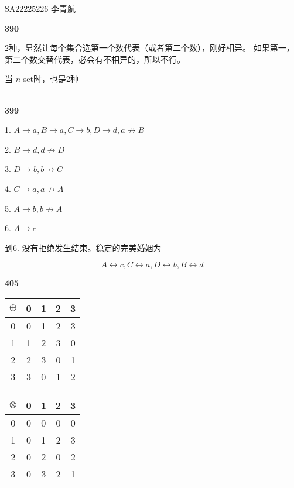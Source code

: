 \documentclass[UTF8]{ctexart}
\begin{document}
    SA22225226 李青航

    \noindent\textbf{390}

    2种，显然让每个集合选第一个数代表（或者第二个数），刚好相异。
    如果第一，第二个数交替代表，必会有不相异的，所以不行。

    当 $n$ set时，也是2种

    ~\\
    \noindent\textbf{399}

    1. $A\rightarrow a, B\rightarrow a, 
    C\rightarrow b, D\rightarrow d, a\not \rightarrow B$

    2. $B\rightarrow d, d\not \rightarrow D$

    3. $D\rightarrow b, b\not \rightarrow C $

    4. $C\rightarrow a, a\not \rightarrow A$

    5. $A \rightarrow b, b\not \rightarrow A$

    6. $A \rightarrow c$

    到6. 没有拒绝发生结束。稳定的完美婚姻为

    $$A \longleftrightarrow  c, C \longleftrightarrow a, D \longleftrightarrow b, B\longleftrightarrow d$$

    \noindent\textbf{405}

    \begin{table}[h]
        \centering
        \begin{tabular}{c|cccc} 
        \toprule
        $\oplus$ & 0 & 1 & 2 & 3  \\ 
        \hline
        0 & 0 & 1 & 2 & 3  \\
        1 & 1 & 2 & 3 & 0  \\
        2 & 2 & 3 & 0 & 1  \\
        3 & 3 & 0 & 1 & 2  \\
        \bottomrule
        \end{tabular}
    \end{table}

    \begin{table}[h]
        \centering
        \begin{tabular}{c|cccc} 
        \toprule
        $\otimes$  & 0 & 1 & 2 & 3  \\ 
        \hline
        0 & 0 & 0 & 0 & 0  \\
        1 & 0 & 1 & 2 & 3  \\
        2 & 0 & 2 & 0 & 2  \\
        3 & 0 & 3 & 2 & 1  \\
        \bottomrule
        \end{tabular}
        \end{table}
\end{document}
